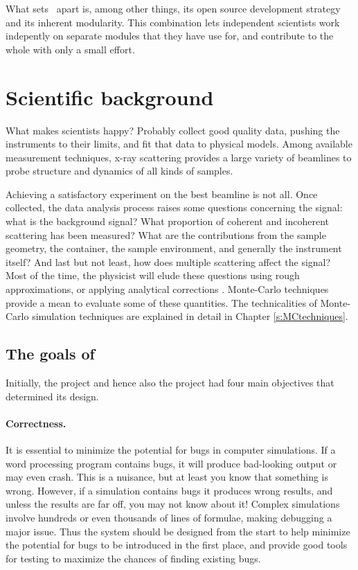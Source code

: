 What sets \MCX\ apart is, among other things, its open source
development strategy and its inherent modularity. 
This combination lets independent scientists work indepently on separate
modules that they have use for, and contribute to the whole with only a small
effort.  

\section{Scientific background}
What makes scientists happy? Probably collect good quality data, pushing the instruments to their limits, and fit that data to physical models.
Among available measurement techniques, x-ray scattering provides a
large variety of beamlines to probe structure and dynamics of all
kinds of samples.

Achieving a satisfactory experiment on the best beamline is not all. Once collected, the data analysis process
raises some questions concerning the signal: what is the background
signal? What proportion of coherent and incoherent scattering has
been measured? What are the contributions from the sample geometry, the
container, the sample environment, and generally the instrument
itself? And last but not least, how does multiple scattering affect the
signal? Most of the time, the physicist will elude these questions
using rough approximations, or applying analytical corrections
\cite{Copley86}. Monte-Carlo techniques provide a mean to evaluate
some of these quantities. The technicalities of Monte-Carlo simulation
techniques are explained in detail in Chapter \ref{s:MCtechniques}.


\subsection{The goals of \MCX}
\label{s:goals}

Initially, the \MCS project and hence also the \MCX project had four main objectives
that determined its design.

\paragraph{Correctness.}
It is essential to minimize the potential for bugs in computer
simulations.  If a word processing program contains bugs, it will
produce bad-looking output or may even crash. This is a nuisance, but at
least you know that something is wrong. However, if a simulation
contains bugs it produces wrong results, and unless the results are far
off, you may not know about it! Complex simulations involve hundreds or
even thousands of lines of formulae, making debugging a major issue. Thus the
system should be designed from the start to help minimize the potential
for bugs to be introduced in the first place, and provide good tools for
testing to maximize the chances of finding existing bugs.
%
